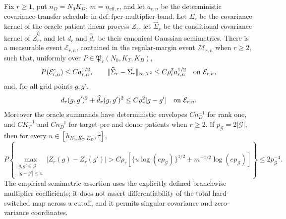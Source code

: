 Fix \(r\ge1\), put \(n_D=N_0K_D\), \(m=n_{\mathrm{eff},r}\), and let
\(a_{r,n}\) be the deterministic covariance-transfer schedule in
\(\mathrm{def:fpcr\mbox{-}multiplier\mbox{-}band}\).  Let \(\Sigma_r\) be
the covariance kernel of the oracle patient linear process \(Z_r\), let
\(\widehat\Sigma_r\) be the conditional covariance kernel of
\(\widehat Z_r^\xi\), and let \(d_r\) and \(\widehat d_r\) be their canonical
Gaussian semimetrics.  There is a measurable event \(\mathcal E_{r,n}\),
contained in the regular-margin event \(\mathcal M_{r,n}\) when \(r\ge2\),
such that, uniformly over \(P\in\mathfrak P_r(N_0,K_T,K_D)\),
\[
 P(\mathcal E_{r,n}^c)\le C a_{r,n}^{1/2},
 \qquad
 \|\widehat\Sigma_r-\Sigma_r\|_{\infty,\mathcal I^2}
 \le C\rho_r^2a_{r,n}^{1/2}\quad\hbox{on }\mathcal E_{r,n},
\]
and, for all grid points \(g,g'\),
\[
 d_r(g,g')^2+\widehat d_r(g,g')^2
 \le C\rho_r^2|g-g'|\quad\hbox{on }\mathcal E_{r,n}.
\]
Moreover the oracle summands have deterministic envelopes \(Cn_D^{-1}\) for
rank one, and \(CK_T^{-1}\) and \(Cn_D^{-1}\) for target-pre and donor
patients when \(r\ge2\).  If \(p_{\mathcal G}=2|\mathcal G|\), then for every
\(u\in[h_{N_0,K_T,K_D},\bar\tau]\),
\[
 P\left\{
 \max_{\substack{g,g'\in\mathcal G\\|g-g'|\le u}}
 |Z_r(g)-Z_r(g')|>
 C\rho_r\left[\{u\log(ep_{\mathcal G})\}^{1/2}
 +m^{-1/2}\log(ep_{\mathcal G})\right]\right\}
 \le 2p_{\mathcal G}^{-4}.
\]
The empirical semimetric assertion uses the explicitly defined branchwise
multiplier coefficients; it does not assert differentiability of the total
hard-switched map across a cutoff, and it permits singular covariance and
zero-variance coordinates.